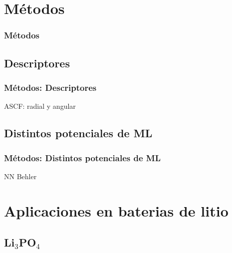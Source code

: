 \documentclass[aspectratio=169]{beamer}
\begin{document}
    \section{Métodos}

    \begin{frame}
        \frametitle{Métodos}
    \end{frame}

    \subsection{Descriptores}
    \begin{frame}
        \frametitle{Métodos: Descriptores}
        ASCF: radial y angular
    \end{frame}

    \subsection{Distintos potenciales de ML}
    \begin{frame}
        \frametitle{Métodos: Distintos potenciales de ML}
        NN Behler
    \end{frame}

    \section{Aplicaciones en baterias de litio}

    \subsection{Li$_3$PO$_4$}
\end{document}
